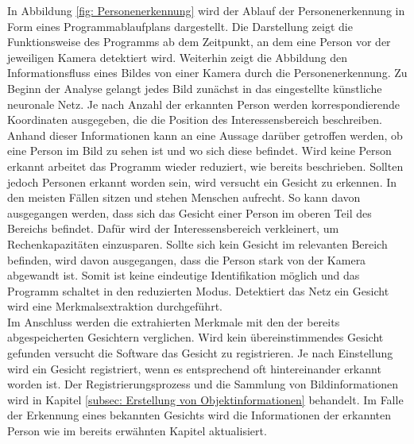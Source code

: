 	In Abbildung \ref{fig: Personenerkennung} wird der Ablauf der Personenerkennung in Form eines Programmablaufplans dargestellt. Die Darstellung zeigt die Funktionsweise des Programms ab dem Zeitpunkt, an dem eine Person vor der jeweiligen Kamera detektiert wird. Weiterhin zeigt die Abbildung den Informationsfluss eines Bildes von einer Kamera durch die Personenerkennung. Zu Beginn der Analyse gelangt jedes Bild zunächst in das eingestellte künstliche neuronale Netz. Je nach Anzahl der erkannten Person werden korrespondierende Koordinaten ausgegeben, die die Position des Interessensbereich beschreiben. Anhand dieser Informationen kann an eine Aussage darüber getroffen werden, ob eine Person im Bild zu sehen ist und wo sich diese befindet. Wird keine Person erkannt arbeitet das Programm wieder reduziert, wie bereits beschrieben. Sollten jedoch Personen erkannt worden sein, wird versucht ein Gesicht zu erkennen. In den meisten Fällen sitzen und stehen Menschen aufrecht. So kann davon ausgegangen werden, dass sich das Gesicht einer Person im oberen Teil des Bereichs befindet. Dafür wird der Interessensbereich verkleinert, um Rechenkapazitäten einzusparen. Sollte sich kein Gesicht im relevanten Bereich befinden, wird davon ausgegangen, dass die Person stark von der Kamera abgewandt ist. Somit ist keine eindeutige Identifikation möglich und das Programm schaltet in den reduzierten Modus. Detektiert das Netz ein Gesicht wird eine Merkmalsextraktion durchgeführt.\\
	
	Im Anschluss werden die extrahierten Merkmale mit den der bereits abgespeicherten Gesichtern verglichen. Wird kein übereinstimmendes Gesicht gefunden versucht die Software das Gesicht zu registrieren. Je nach Einstellung wird ein Gesicht registriert, wenn es entsprechend oft hintereinander erkannt worden ist. Der Registrierungsprozess und die Sammlung von Bildinformationen wird in Kapitel \ref{subsec: Erstellung von Objektinformationen} behandelt. Im Falle der Erkennung eines bekannten Gesichts wird die Informationen der erkannten Person wie im bereits erwähnten Kapitel aktualisiert.\\ 
	
